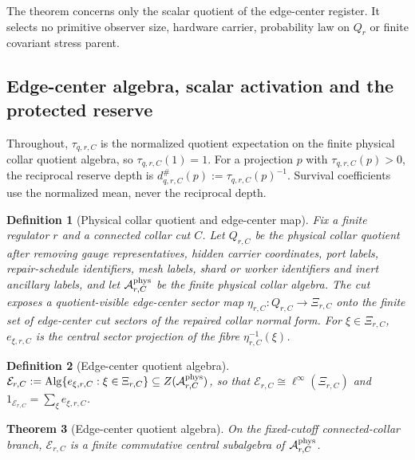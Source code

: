 \documentclass[11pt]{article}
\newtheorem{theorem}{Theorem}[section]
\newtheorem{definition}[theorem]{Definition}
\theoremstyle{remark}
\theoremstyle{plain}
\begin{document}
The theorem concerns only the scalar quotient of the edge-center register. It
selects no primitive observer size, hardware carrier, probability law on
\(Q_r\) or finite covariant stress parent.

\subsection{Edge-center algebra, scalar activation and the protected reserve}
\label{sec:quotient-edge-scalar-z6}

Throughout, \(\tau_{q,r,C}\) is the normalized quotient expectation on the
finite physical collar quotient algebra, so \(\tau_{q,r,C}(1)=1\). For a
projection \(p\) with \(\tau_{q,r,C}(p)>0\), the reciprocal reserve depth is
\(d^{\#}_{q,r,C}(p):=\tau_{q,r,C}(p)^{-1}\). Survival coefficients use the
normalized mean, never the reciprocal depth.

\begin{definition}[Physical collar quotient and edge-center map]
\label{def:physical-collar-edge-center-map}
Fix a finite regulator \(r\) and a connected collar cut \(C\). Let \(Q_{r,C}\)
be the physical collar quotient after removing gauge representatives, hidden
carrier coordinates, port labels, repair-schedule identifiers, mesh labels,
shard or worker identifiers and inert ancillary labels, and let
\(\mathcal A^{\rm phys}_{r,C}\) be the finite physical collar algebra. The cut
exposes a quotient-visible edge-center sector map
\(\eta_{r,C}:Q_{r,C}\to\Xi_{r,C}\) onto the finite set of edge-center cut
sectors of the repaired collar normal form. For \(\xi\in\Xi_{r,C}\),
\(e_{\xi,r,C}\) is the central sector projection of the fibre
\(\eta_{r,C}^{-1}(\xi)\).
\end{definition}

\begin{definition}[Edge-center quotient algebra]
\label{def:edge-center-quotient-algebra}
\(\mathcal E_{r,C}:=\operatorname{Alg}\{e_{\xi,r,C}:\xi\in\Xi_{r,C}\}
\subseteq Z(\mathcal A^{\rm phys}_{r,C})\), so that
\(\mathcal E_{r,C}\cong\ell^\infty(\Xi_{r,C})\) and
\(1_{\mathcal E_{r,C}}=\sum_\xi e_{\xi,r,C}\).
\end{definition}

\begin{theorem}[Edge-center quotient algebra]
\label{thm:edge-center-quotient-algebra}
On the fixed-cutoff connected-collar branch, \(\mathcal E_{r,C}\) is a finite
commutative central subalgebra of \(\mathcal A^{\rm phys}_{r,C}\).
\end{theorem}
\end{document}
